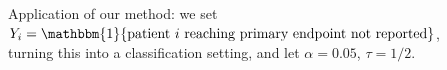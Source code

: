 \documentclass[preview]{standalone}
\newcommand{\one}{\mathbbm{1}}
\def\textboxwidthplus10pc{1.3035\textwidth}
\begin{document}
\begin{center}
\parbox{\textboxwidthplus10pc}{Application of our method: we set $Y_i = \one\{\text{patient }i\text{ reaching primary endpoint not reported}\}$,\\ turning this into a classification setting, and let $\alpha = 0.05$, $\tau = 1/2$.}
\end{center}
\end{document}
